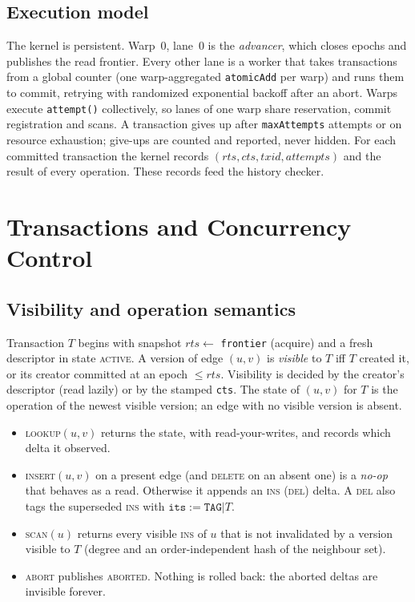 \documentclass[sigconf,nonacm]{acmart}
\newcommand{\code}[1]{\texttt{#1}}
\begin{document}
\subsection{Execution model}
The kernel is persistent. Warp~0, lane~0 is the \emph{advancer}, which closes epochs and publishes the read frontier.
Every other lane is a worker that takes transactions from a global counter (one warp-aggregated \code{atomicAdd} per
warp) and runs them to commit, retrying with randomized exponential backoff after an abort. Warps execute
\code{attempt()} collectively, so lanes of one warp share reservation, commit registration and scans. A transaction
gives up after \code{maxAttempts} attempts or on resource exhaustion; give-ups are counted and reported, never hidden.
For each committed transaction the kernel records $(rts, cts, txid, attempts)$ and the result of every operation.
These records feed the history checker.

\section{Transactions and Concurrency Control}
\label{sec:cc}

\subsection{Visibility and operation semantics}
Transaction $T$ begins with snapshot $rts \leftarrow$ \code{frontier} (acquire) and a fresh descriptor in state
\textsc{active}. A version of edge $(u,v)$ is \emph{visible} to $T$ iff $T$ created it, or its creator committed at an
epoch $\le rts$. Visibility is decided by the creator's descriptor (read lazily) or by the stamped \code{cts}. The
state of $(u,v)$ for $T$ is the operation of the newest visible version; an edge with no visible version is absent.

\begin{itemize}
\item \textsc{lookup}$(u,v)$ returns the state, with read-your-writes, and records which delta it observed.
\item \textsc{insert}$(u,v)$ on a present edge (and \textsc{delete} on an absent one) is a \emph{no-op} that behaves as
a read. Otherwise it appends an \textsc{ins} (\textsc{del}) delta. A \textsc{del} also tags the superseded
\textsc{ins} with $\code{its} := \code{TAG}|T$.
\item \textsc{scan}$(u)$ returns every visible \textsc{ins} of $u$ that is not invalidated by a version visible to $T$
(degree and an order-independent hash of the neighbour set).
\item \textsc{abort} publishes \textsc{aborted}. Nothing is rolled back: the aborted deltas are invisible forever.
\end{itemize}
\end{document}
